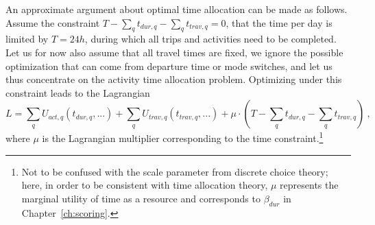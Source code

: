 An approximate argument about optimal time allocation can be made as follows.
Assume the constraint
$T - \sum_q t_{dur,q} - \sum_q t_{trav,q} = 0$, \ie that the time per day is limited by $T = 24h$, during which all trips and activities need to be completed.
%
%
%
Let us for now also assume that all travel times are fixed, \ie we ignore the possible optimization that can come from departure time or mode switches, and let us thus concentrate on the activity time allocation problem.
%
Optimizing under 
this constraint leads to the Lagrangian
\begin{equation}
L = \sum_q U_{act,q}(t_{dur,q}, ...) + \sum_q U_{trav,q}(t_{trav,q}, ...)
%
%
+ \mu \cdot (T - \sum_q t_{dur,q} - \sum_q t_{trav,q})  \ ,
\label{eq:lagrangian}
\end{equation}
where $\mu$ is the Lagrangian multiplier corresponding to the time constraint.\footnote{%
%
Not to be confused with the scale parameter from discrete choice theory; here, in order to be consistent with time allocation theory, $\mu$ represents the marginal utility of time as a resource and corresponds to $\beta_{dur}$ in Chapter~\ref{ch:scoring}.
%
}

